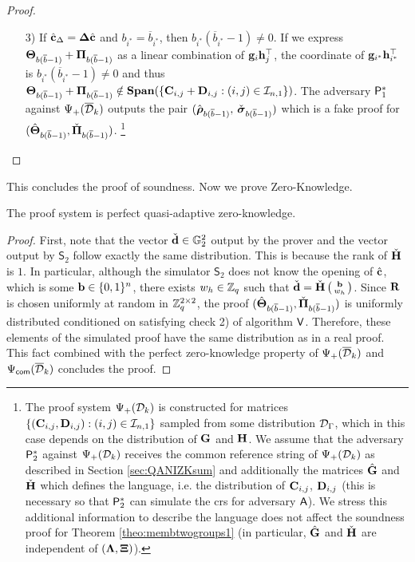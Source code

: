 \begin{proof}
\begin{itemize}
\item[3)] If $\hat{\mathbf{c}}_{\Delta} = \mathbf{{\Delta}} \hat{\mathbf{c}}$ and $b_{i^*} = \overline{b}_{i^*}$, then 
$b_{i^*}(\overline{b}_{i^*} -1) \neq 0$.
If we express $\mathbf{{\Theta}}_{b(\overline{b}-1)}+\mathbf{{\Pi}}_{b(\overline{b}-1)}$
as a linear combination of $\mathbf{g}_{i}\mathbf{h}_{j}^{\top}$, the coordinate of
$\mathbf{g}_{i^*}\mathbf{h}_{i^*}^\top$ is $b_{i^*}(\overline{b}_{i^*}-1)\neq 0$ and thus $\mathbf{{\Theta}}_{b(\overline{b}-1)}+\mathbf{{\Pi}}_{b(\overline{b}-1)}\notin\mathbf{Span}(\{\mathbf{{C}}_{i,j}+\mathbf{{D}}_{i,j}:(i,j)\in\mathcal{I}_{n,1}\})$.
The adversary $\mathsf{P}^*_1$ against ${\Psi_{+}(\overline{\mathcal{D}}_k)}$  outputs the pair
$(\hat{{\boldsymbol \rho}}_{b(\overline{b}-1)},$ $\check{{\boldsymbol \sigma}}_{b(\overline{b}-1)})$
which is a fake proof for $({\hat{\mathbf{{\Theta}}}}_{b(\overline{b}-1)}, \check{\mathbf{{\Pi}}}_{b(\overline{b}-1)})$. \footnote{The proof system $\Psi_{+}(\mathcal{D}_k)$ is constructed for matrices $\{(\mathbf{{C}}_{i,j},\mathbf{{D}}_{i,j}):(i,j)\in\mathcal{I}_{n,1}\}$ sampled from some distribution $\mathcal{D}_{\Gamma}$, which in this case depends on the distribution of $\mathbf{{G}}$ and $\mathbf{{H}}$. We assume that the adversary $\mathsf{P}^*_2$ against $\Psi_{+}(\mathcal{D}_k)$ receives the common reference string of $\Psi_{+}(\mathcal{D}_k)$ as described in Section \ref{sec:QANIZKsum} and additionally the matrices ${\hat{\mathbf{{G}}}}$ and $\check{\mathbf{{H}}}$ which defines the language, i.e. the distribution of $\mathbf{{C}}_{i,j}$, $\mathbf{{D}}_{i,j}$ (this is necessary so that $\mathsf{P}^*_2$ can simulate the crs for adversary $\mathsf{A}$). We stress this additional information to describe the language does not affect the soundness proof for Theorem \ref{theo:membtwogroups1} (in particular,  ${\hat{\mathbf{{G}}}}$ and $\check{\mathbf{{H}}}$ are independent of $(\mathbf{{\Lambda}}, \mathbf{{\Xi}})$).}
\end{itemize}
\end{proof}

This concludes the proof of soundness. Now we prove Zero-Knowledge.

\begin{theorem}
The proof system is perfect quasi-adaptive zero-knowledge.
\end{theorem} 
\begin{proof}  First, note that the vector $\check{\mathbf{d}} \in \mathbb{G}_2^2$ output by the prover and the vector output by $\mathsf{S}_2$ follow exactly the same distribution. This is because the rank of $\check{\mathbf{{H}}}$ is $1$. In particular, although the simulator $\mathsf{S}_2$ does not know the opening of ${\hat{\mathbf{c}}}$, which is some $\mathbf{b} \in \{0,1\}^{n}$, 
there exists $w_h \in \mathbb{Z}_q$ such that $\check{\mathbf{d}}=\check{\mathbf{{H}}}\left(\begin{smallmatrix}\mathbf{b}\\ w_h\end{smallmatrix}\right)$. 
Since $\mathbf{{R}}$ is chosen uniformly at random in $\mathbb{Z}_q^{2 \times 2}$, the proof $({\hat{\mathbf{{\Theta}}}}_{b(\overline{b}-1)}, \check{\mathbf{{\Pi}}}_{b(\overline{b}-1)})$ is uniformly distributed conditioned on satisfying check 2) of algorithm $\mathsf{V}$.
Therefore, these elements of the simulated proof have the same distribution as in a real proof. This fact combined with the perfect zero-knowledge property of ${\Psi_{+}(\overline{\mathcal{D}}_k)}$  and ${{\Psi_{\mathsf{com}}(\overline{\mathcal{D}}_k)}}$ concludes the proof. 
\end{proof}


